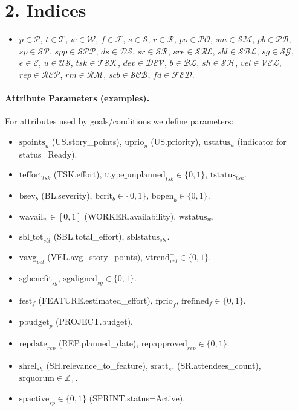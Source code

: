 \documentclass[a4paper,11pt]{article}
\begin{document}
\section{2. Indices}
\begin{itemize}[leftmargin=2.2em]
  \item $p\in\mathcal{P}$, $t\in\mathcal{T}$, $w\in\mathcal{W}$, $f\in\mathcal{F}$, $s\in\mathcal{S}$, $r\in\mathcal{R}$,
  $po\in\mathcal{PO}$, $sm\in\mathcal{SM}$, $pb\in\mathcal{PB}$, $sp\in\mathcal{SP}$, $spp\in\mathcal{SPP}$, $ds\in\mathcal{DS}$, $sr\in\mathcal{SR}$, $sre\in\mathcal{SRE}$, $sbl\in\mathcal{SBL}$, $sg\in\mathcal{SG}$, $e\in\mathcal{E}$, $u\in\mathcal{US}$, $tsk\in\mathcal{TSK}$, $dev\in\mathcal{DEV}$, $b\in\mathcal{BL}$, $sh\in\mathcal{SH}$, $vel\in\mathcal{VEL}$, $rep\in\mathcal{REP}$, $rm\in\mathcal{RM}$, $scb\in\mathcal{SCB}$, $fd\in\mathcal{FED}$.
\end{itemize}

\paragraph{Attribute Parameters (examples).}
For attributes used by goals/conditions we define parameters:
\begin{itemize}[leftmargin=2.2em]
  \item $\text{spoints}_u$ (US.story\_points), $\text{uprio}_u$ (US.priority), $\text{ustatus}_u$ (indicator for status{=}Ready).
  \item $\text{teffort}_{tsk}$ (TSK.effort), $\text{ttype\_unplanned}_{tsk}\in\{0,1\}$, $\text{tstatus}_{tsk}$.
  \item $\text{bsev}_b$ (BL.severity), $\text{bcrit}_b\in\{0,1\}$, $\text{bopen}_b\in\{0,1\}$.
  \item $\text{wavail}_w\in[0,1]$ (WORKER.availability), $\text{wstatus}_w$.
  \item $\text{sbl\_tot}_{sbl}$ (SBL.total\_effort), $\text{sblstatus}_{sbl}$.
  \item $\text{vavg}_{vel}$ (VEL.avg\_story\_points), $\text{vtrend}^{+}_{vel}\in\{0,1\}$.
  \item $\text{sgbenefit}_{sg}$, $\text{sgaligned}_{sg}\in\{0,1\}$.
  \item $\text{fest}_{f}$ (FEATURE.estimated\_effort), $\text{fprio}_{f}$, $\text{frefined}_{f}\in\{0,1\}$.
  \item $\text{pbudget}_{p}$ (PROJECT.budget).
  \item $\text{repdate}_{rep}$ (REP.planned\_date), $\text{repapproved}_{rep}\in\{0,1\}$.
  \item $\text{shrel}_{sh}$ (SH.relevance\_to\_feature), $\text{sratt}_{sr}$ (SR.attendees\_count), $\text{srquorum}\in\mathbb{Z}_{+}$.
  \item $\text{spactive}_{sp}\in\{0,1\}$ (SPRINT.status{=}Active).
\end{itemize}
\end{document}
